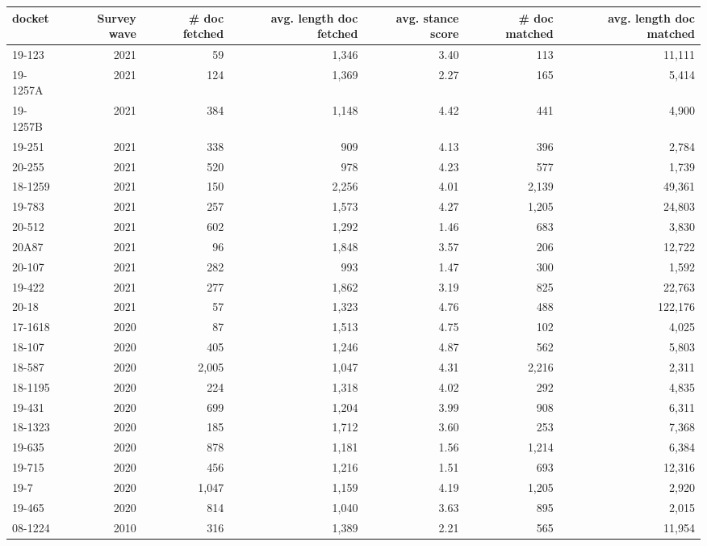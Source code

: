 \begin{tabular}{l|r|r|r|r|r|r}
\hline
docket & Survey wave & \# doc fetched & avg. length doc fetched & avg. stance score & \# doc matched & avg. length doc matched \\ \hline
19-123    & 2021 &    59 &  1,346 &  3.40 &   113 &   11,111 \\
19-1257A  & 2021 &   124 &  1,369 &  2.27 &   165 &    5,414 \\
19-1257B  & 2021 &   384 &  1,148 &  4.42 &   441 &    4,900 \\
19-251    & 2021 &   338 &    909 &  4.13 &   396 &    2,784 \\
20-255    & 2021 &   520 &    978 &  4.23 &   577 &    1,739 \\
18-1259   & 2021 &   150 &  2,256 &  4.01 & 2,139 &   49,361 \\
19-783    & 2021 &   257 &  1,573 &  4.27 & 1,205 &   24,803 \\
20-512    & 2021 &   602 &  1,292 &  1.46 &   683 &    3,830 \\
20A87     & 2021 &    96 &  1,848 &  3.57 &   206 &   12,722 \\
20-107    & 2021 &   282 &    993 &  1.47 &   300 &    1,592 \\
19-422    & 2021 &   277 &  1,862 &  3.19 &   825 &   22,763 \\
20-18     & 2021 &    57 &  1,323 &  4.76 &   488 &  122,176 \\
17-1618   & 2020 &    87 &  1,513 &  4.75 &   102 &    4,025 \\
18-107    & 2020 &   405 &  1,246 &  4.87 &   562 &    5,803 \\
18-587    & 2020 & 2,005 &  1,047 &  4.31 & 2,216 &    2,311 \\
18-1195   & 2020 &   224 &  1,318 &  4.02 &   292 &    4,835 \\
19-431    & 2020 &   699 &  1,204 &  3.99 &   908 &    6,311 \\
18-1323   & 2020 &   185 &  1,712 &  3.60 &   253 &    7,368 \\
19-635    & 2020 &   878 &  1,181 &  1.56 & 1,214 &    6,384 \\
19-715    & 2020 &   456 &  1,216 &  1.51 &   693 &   12,316 \\
19-7      & 2020 & 1,047 &  1,159 &  4.19 & 1,205 &    2,920 \\
19-465    & 2020 &   814 &  1,040 &  3.63 &   895 &    2,015 \\
08-1224   & 2010 &   316 &  1,389 &  2.21 &   565 &   11,954 \\

\end{tabular}
